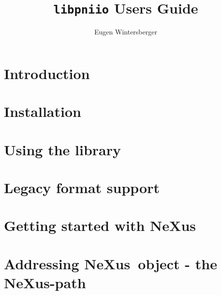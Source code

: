 \documentclass[a4paper,draft]{scrbook}
\title{{\Huge{\texttt{libpniio}} Users Guide}}
\author{Eugen Wintersberger}
\newcommand{\nexus}{NeXus}
\begin{document}
\maketitle
\tableofcontents
\listoftodos

\chapter{Introduction}\label{chapter:introduction}

\FloatBarrier

\chapter{Installation}\label{chapter:installation}

\FloatBarrier

\chapter{Using the library}\label{chapter:usage}

\FloatBarrier

\chapter{Legacy format support}\label{chapter:legacy_formats}

\FloatBarrier

\chapter{Getting started with \nexus}\label{chapter:nexus_quickstart}

\FloatBarrier

\chapter{Addressing \nexus\ object - the \nexus-path}\label{chapter:nxpath}

\FloatBarrier

\end{document}
